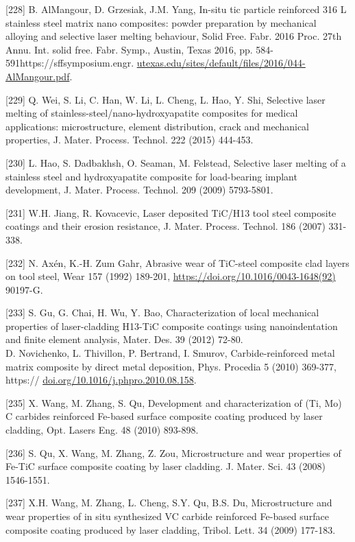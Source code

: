 \documentclass[10pt]{article}
\begin{document}
[228] B. AlMangour, D. Grzesiak, J.M. Yang, In-situ tic particle reinforced 316 L stainless steel matrix nano composites: powder preparation by mechanical alloying and selective laser melting behaviour, Solid Free. Fabr. 2016 Proc. 27th Annu. Int. solid free. Fabr. Symp., Austin, Texas 2016, pp. 584-591https://sffsymposium.engr. \href{http://utexas.edu/sites/default/files/2016/044-AlMangour.pdf}{utexas.edu/sites/default/files/2016/044-AlMangour.pdf}.

[229] Q. Wei, S. Li, C. Han, W. Li, L. Cheng, L. Hao, Y. Shi, Selective laser melting of stainless-steel/nano-hydroxyapatite composites for medical applications: microstructure, element distribution, crack and mechanical properties, J. Mater. Process. Technol. 222 (2015) 444-453.

[230] L. Hao, S. Dadbakhsh, O. Seaman, M. Felstead, Selective laser melting of a stainless steel and hydroxyapatite composite for load-bearing implant development, J. Mater. Process. Technol. 209 (2009) 5793-5801.

[231] W.H. Jiang, R. Kovacevic, Laser deposited TiC/H13 tool steel composite coatings and their erosion resistance, J. Mater. Process. Technol. 186 (2007) 331-338.

[232] N. Axén, K.-H. Zum Gahr, Abrasive wear of TiC-steel composite clad layers on tool steel, Wear 157 (1992) 189-201, \href{https://doi.org/10.1016/0043-1648(92)}{https://doi.org/10.1016/0043-1648(92)} 90197-G.

[233] S. Gu, G. Chai, H. Wu, Y. Bao, Characterization of local mechanical properties of laser-cladding H13-TiC composite coatings using nanoindentation and finite element analysis, Mater. Des. 39 (2012) 72-80.\\
[234] D. Novichenko, L. Thivillon, P. Bertrand, I. Smurov, Carbide-reinforced metal matrix composite by direct metal deposition, Phys. Procedia 5 (2010) 369-377, https:// \href{http://doi.org/10.1016/j.phpro.2010.08.158}{doi.org/10.1016/j.phpro.2010.08.158}.

[235] X. Wang, M. Zhang, S. Qu, Development and characterization of (Ti, Mo) C carbides reinforced Fe-based surface composite coating produced by laser cladding, Opt. Lasers Eng. 48 (2010) 893-898.

[236] S. Qu, X. Wang, M. Zhang, Z. Zou, Microstructure and wear properties of Fe-TiC surface composite coating by laser cladding. J. Mater. Sci. 43 (2008) 1546-1551.

[237] X.H. Wang, M. Zhang, L. Cheng, S.Y. Qu, B.S. Du, Microstructure and wear properties of in situ synthesized VC carbide reinforced Fe-based surface composite coating produced by laser cladding, Tribol. Lett. 34 (2009) 177-183.
\end{document}
